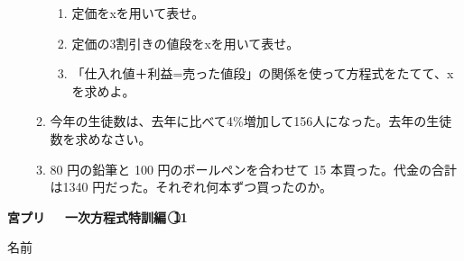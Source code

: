 \documentclass[a4paper,fleqn,papersize,15pt]{jsarticle}
\begin{document}
\begin{itemize}
\begin{enumerate}
\begin{enumerate}
\item 定価をxを用いて表せ。 \vfill \begin{flushright}\framebox[8em]{\rule{0pt}{6ex}}\end{flushright} %
\item 定価の3割引きの値段をxを用いて表せ。 \vfill \begin{flushright}\framebox[8em]{\rule{0pt}{6ex}}\end{flushright} %
\item 「仕入れ値＋利益=売った値段」の関係を使って方程式をたてて、xを求めよ。 \vfill \begin{flushright}\framebox[8em]{\rule{0pt}{6ex}}\end{flushright} %
\end{enumerate}
\item 今年の生徒数は、去年に比べて4\%増加して156人になった。去年の生徒数を求めなさい。 \vfill \begin{flushright}\framebox[8em]{\rule{0pt}{6ex}}\end{flushright} %
\item 80 円の鉛筆と 100 円のボールペンを合わせて 15 本買った。代金の合計は1340 円だった。それぞれ何本ずつ買ったのか。 \vfill \begin{flushright}\framebox[8em]{\rule{0pt}{6ex}}\end{flushright} %
\end{enumerate}
    \vfill
\end{itemize}
\clearpage
 \begin{center}
   \LARGE\textbf{宮プリ　~一次方程式特訓編~\textcircled{\scriptsize 11}}
     \begin{flushright}
       名前\underline{\hspace{8zw}}
     \end{flushright}
 \end{center}
\end{document}
